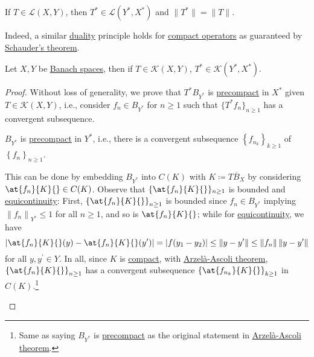 \begin{prev}
	If \(T\in \mathcal{L} (X, Y)\), then \(T^{\ast} \in \mathcal{L} (Y^{\ast} , X^{\ast} )\) and \(\lVert T^{\ast}  \rVert = \lVert T \rVert \).
\end{prev}

Indeed, a similar \hyperref[def:dual-space]{duality} principle holds for \hyperref[def:compact-op]{compact operators} as guaranteed by \hyperref[thm:Schauder]{Schauder's theorem}.

\begin{theorem}\label{thm:Schauder}
	Let \(X, Y\) be \hyperref[def:Banach-space]{Banach spaces}, then if \(T\in \mathcal{K}(X, Y)\), \(T^{\ast} \in \mathcal{K}(Y^{\ast} , X^{\ast} )\).
\end{theorem}
\begin{proof}
	Without loss of generality, we prove that \(T^{\ast} B_{Y^{\ast} }\) is \hyperref[def:precompact]{precompact} in \(X^{\ast}\) given \(T\in \mathcal{K}(X, Y)\), i.e., consider \(f_n \in B_{Y^{\ast} }\) for \(n \geq 1\) such that \(\{T^{\ast} f_n\}_{n\geq 1}\) has a convergent subsequence.

	\begin{claim}
		\(B_{Y^{\ast} }\) is \hyperref[def:precompact]{precompact} in \(Y^{\ast} \), i.e., there is a convergent subsequence \(\left\{ f_{n_k} \right\} _{k\geq 1}\) of \(\left\{ f_n \right\} _{n\geq 1}\).
	\end{claim}
	\begin{explanation}
		This can be done by embedding \(B_{Y^{\ast} }\) into \(C(K)\) with \(K\coloneqq \overline{TB_X}\) by considering \(\at{f_n}{K}{} \in C(K)\). Observe that \(\{\at{f_n}{K}{}\}_{n\geq 1}\) is bounded and \hyperref[def:equicontinuous]{equicontinuity}: First, \(\left\{ \at{f_n}{K}{}  \right\} _{n\geq 1}\) is bounded since \(f_{n} \in B_{Y^{\ast} }\) implying \(\left\lVert f_n \right\rVert _{Y^{\ast} } \leq 1\) for all \(n\geq 1\), and so is \(\at{f_n}{K}{} \); while for \hyperref[def:equicontinuous]{equicontinuity}, we have
		\[
			\left\vert \at{f_{n}}{K}{} (y) - \at{f_{n}}{K}{} (y^\prime ) \right\vert
			= \vert f(y_1 - y_2) \vert
			\leq \left\lVert y - y^\prime \right\rVert
			\leq \left\lVert f_{n} \right\rVert \left\lVert y-y^\prime \right\rVert
		\]
		for all \(y, y^\prime \in Y\). In all, since \(K\) is \hyperref[def:compact]{compact}, with \hyperref[thm:Arzela-Ascoli]{Arzelà-Ascoli theorem}, \(\left\{ \at{f_n}{K}{} \right\}_{n\geq 1} \) has a convergent subsequence \(\left\{ \at{f_{n_k}}{K}{}\right\}_{k\geq 1} \) in \(C(K)\).\footnote{Same as saying \(B_{Y^{\ast} }\) is \hyperref[def:precompact]{precompact} as the original statement in \hyperref[thm:Arzela-Ascoli]{Arzelà-Ascoli theorem}.}
	\end{explanation}


\end{proof}
